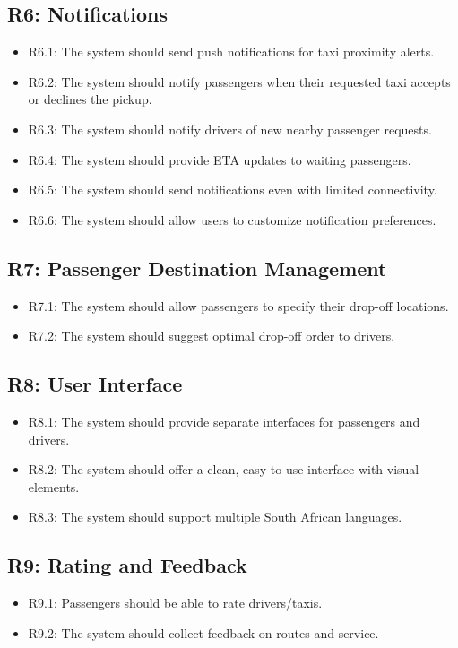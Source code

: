 \documentclass[a4paper,12pt]{article}
\begin{document}
\subsection*{R6: Notifications}
\begin{itemize}
    \item R6.1: The system should send push notifications for taxi proximity alerts.
    \item R6.2: The system should notify passengers when their requested taxi accepts or declines the pickup.
    \item R6.3: The system should notify drivers of new nearby passenger requests.
    \item R6.4: The system should provide ETA updates to waiting passengers.
    \item R6.5: The system should send notifications even with limited connectivity.
    \item R6.6: The system should allow users to customize notification preferences.
\end{itemize}

\subsection*{R7: Passenger Destination Management}
\begin{itemize}
    \item R7.1: The system should allow passengers to specify their drop-off locations.
    \item R7.2: The system should suggest optimal drop-off order to drivers.
\end{itemize}

\subsection*{R8: User Interface}
\begin{itemize}
    \item R8.1: The system should provide separate interfaces for passengers and drivers.
    \item R8.2: The system should offer a clean, easy-to-use interface with visual elements.
    \item R8.3: The system should support multiple South African languages. 
\end{itemize}

\subsection*{R9: Rating and Feedback}
\begin{itemize}
    \item R9.1: Passengers should be able to rate drivers/taxis.
    \item R9.2: The system should collect feedback on routes and service.
\end{itemize}
\end{document}
